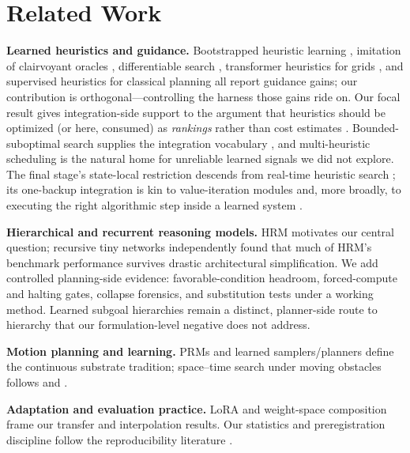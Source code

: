 \documentclass[letterpaper]{article} %
\begin{document}
\section{Related Work}

\textbf{Learned heuristics and guidance.} Bootstrapped heuristic learning \citep{arfaee2011bootstrap}, imitation of clairvoyant oracles \citep{bhardwaj2017sail}, differentiable search \citep{yonetani2021neuralastar}, transformer heuristics for grids \citep{kirilenko2023transpath}, and supervised heuristics for classical planning \citep{ferber2020neural} all report guidance gains; our contribution is orthogonal---controlling the harness those gains ride on. Our focal result gives integration-side support to the argument that heuristics should be optimized (or here, consumed) as \emph{rankings} rather than cost estimates \citep{chrestien2023rank}. Bounded-suboptimal search supplies the integration vocabulary \citep{pohl1970,pearl1982semiadmissible}, and multi-heuristic scheduling \citep{aine2016mha} is the natural home for unreliable learned signals we did not explore. The final stage's state-local restriction descends from real-time heuristic search \citep{korf1990rta,koenig2006rtaa}; its one-backup integration is kin to value-iteration modules \citep{tamar2016vin,lee2018gppn} and, more broadly, to executing the right algorithmic step inside a learned system \citep{velickovic2021nar}.

\textbf{Hierarchical and recurrent reasoning models.} HRM \citep{wang2025hrm} motivates our central question; recursive tiny networks \citep{jolicoeur2025trm} independently found that much of HRM's benchmark performance survives drastic architectural simplification. We add controlled planning-side evidence: favorable-condition headroom, forced-compute and halting gates, collapse forensics, and substitution tests under a working method. Learned subgoal hierarchies \citep{czechowski2021subgoal} remain a distinct, planner-side route to hierarchy that our formulation-level negative does not address.

\textbf{Motion planning and learning.} PRMs \citep{kavraki1996prm} and learned samplers/planners \citep{ichter2018sampling,qureshi2019mpnet} define the continuous substrate tradition; space--time search under moving obstacles follows \citet{silver2005cooperative} and \citet{phillips2011sipp}.

\textbf{Adaptation and evaluation practice.} LoRA \citep{hu2021lora} and weight-space composition \citep{wortsman2022soups,ilharco2022task} frame our transfer and interpolation results. Our statistics and preregistration discipline follow the reproducibility literature \citep{henderson2018matters,agarwal2021precipice,pineau2021reproducibility}.
\end{document}
